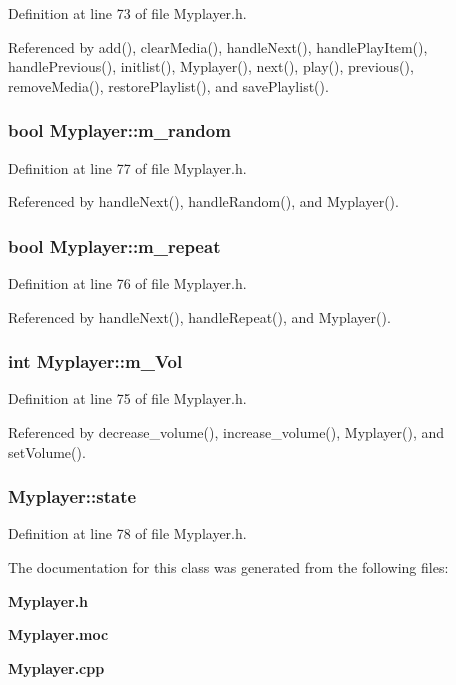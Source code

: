 Definition at line 73 of file Myplayer.h.

Referenced by add(), clear\-Media(), handle\-Next(), handle\-Play\-Item(), handle\-Previous(), initlist(), Myplayer(), next(), play(), previous(), remove\-Media(), restore\-Playlist(), and save\-Playlist().
\subsubsection{\setlength{\rightskip}{0pt plus 5cm}bool {\bf Myplayer::m\_\-random}\hspace{0.3cm}{\tt  [private]}}\label{classMyplayer_Myplayerr4}




Definition at line 77 of file Myplayer.h.

Referenced by handle\-Next(), handle\-Random(), and Myplayer().
\subsubsection{\setlength{\rightskip}{0pt plus 5cm}bool {\bf Myplayer::m\_\-repeat}\hspace{0.3cm}{\tt  [private]}}\label{classMyplayer_Myplayerr3}




Definition at line 76 of file Myplayer.h.

Referenced by handle\-Next(), handle\-Repeat(), and Myplayer().
\subsubsection{\setlength{\rightskip}{0pt plus 5cm}int {\bf Myplayer::m\_\-Vol}\hspace{0.3cm}{\tt  [private]}}\label{classMyplayer_Myplayerr2}




Definition at line 75 of file Myplayer.h.

Referenced by decrease\_\-volume(), increase\_\-volume(), Myplayer(), and set\-Volume().
\subsubsection{ {\bf Myplayer::state}\hspace{0.3cm}{\tt  [private]}}\label{classMyplayer_Myplayerr5}




Definition at line 78 of file Myplayer.h.

The documentation for this class was generated from the following files:\begin{CompactItemize}
\item 
{\bf Myplayer.h}\item 
{\bf Myplayer.moc}\item 
{\bf Myplayer.cpp}\end{CompactItemize}
